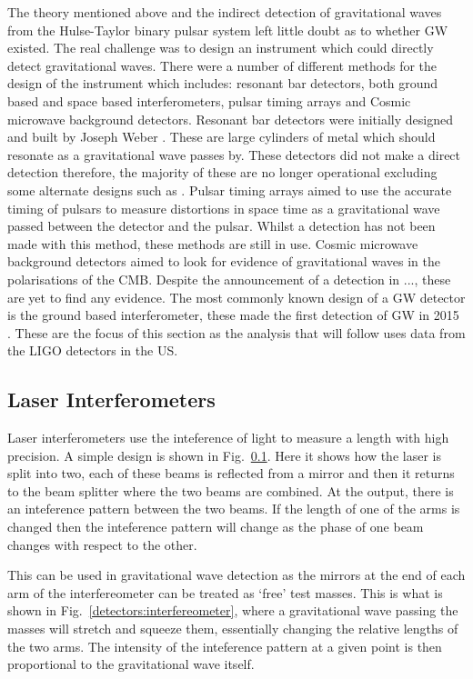 The theory mentioned above and the indirect detection of gravitational waves from the Hulse-Taylor binary pulsar system left little doubt as to whether \ac{GW} existed. 
The real challenge was to design an instrument which could directly detect gravitational waves.
There were a number of different methods for the design of the instrument which includes: resonant bar detectors, both ground based and space based interferometers, pulsar timing arrays and Cosmic microwave background detectors. 
Resonant bar detectors were initially designed and built by Joseph Weber \cite{}.
These are large cylinders of metal which should resonate as a gravitational wave passes by. 
These detectors did not make a direct detection therefore, the majority of these are no longer operational excluding some alternate designs such as \cite{}.
Pulsar timing arrays aimed to use the accurate timing of pulsars to measure distortions in space time as a gravitational wave passed between the detector and the pulsar. 
Whilst a detection has not been made with this method, these methods are still in use.
Cosmic microwave background detectors aimed to look for evidence of gravitational waves in the polarisations of the CMB. 
Despite the announcement of a detection in ..., these are yet to find any evidence.
The most commonly known design of a \ac{GW} detector is the ground based interferometer, these made the first detection of \ac{GW} in 2015 \cite{}.
These are the focus of this section as the analysis that will follow uses data from the \ac{LIGO} detectors in the US.

\subsection{Laser Interferometers}

Laser interferometers use the inteference of light to measure a length with high precision.
A simple design is shown in Fig.~\ref{}. 
Here it shows how the laser is split into two, each of these beams is reflected from a mirror and then it returns to the beam splitter where the two beams are combined.
At the output, there is an inteference pattern between the two beams.
If the length of one of the arms is changed then the inteference pattern will change as the phase of one beam changes with respect to the other.

This can be used in gravitational wave detection as the mirrors at the end of each arm of the interfereometer can be treated as `free' test masses.
This is what is shown in Fig.~\ref{detectors:interfereometer}, where a gravitational wave passing the masses will stretch and squeeze them, essentially changing the relative lengths of the two arms.
The intensity of the inteference pattern at a given point is then proportional to the gravitational wave itself.

